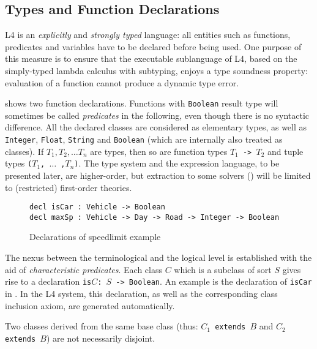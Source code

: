 \subsection{Types and Function Declarations}\label{sec:fundecls}

L4 is an \emph{explicitly} and \emph{strongly typed} language: all entities
such as functions, predicates and variables have to be declared before being
used. One purpose of this measure is to ensure that the executable sublanguage
of L4, based on the simply-typed lambda calculus with subtyping, enjoys a type
soundness property: evaluation of a function cannot produce a dynamic type
error.

 shows two function declarations. Functions with
\texttt{Boolean} result type will sometimes be called \emph{predicates} in the
following, even though there is no syntactic difference. All the declared
classes are considered as elementary types, as well as \texttt{Integer},
\texttt{Float}, \texttt{String} and \texttt{Boolean} (which are internally also treated as
classes). If $T_1, T_2, \dots T_n$ are types, then so are function types
\texttt{$T_1$ -> $T_2$} and tuple types \texttt{($T_1$, $\dots$ ,$T_n$)}. The
type system and the expression language, to be presented later, are
higher-order, but extraction to some solvers (\secref{}) will be limited to
(restricted) first-order theories.

\begin{figure}[h]
\begin{lstlisting}
decl isCar : Vehicle -> Boolean
decl maxSp : Vehicle -> Day -> Road -> Integer -> Boolean
\end{lstlisting}
  \caption{Declarations of speedlimit example}\label{fig:fundecls}
\end{figure}

The nexus between the terminological and the logical level is established with
the aid of \emph{characteristic predicates}. Each class $C$ which is a
subclass of sort $S$ gives rise to a declaration \texttt{is$C$: $S$ ->
  Boolean}. An example is the declaration of \texttt{isCar} in
. In the L4 system, this declaration, as well as the
corresponding class inclusion axiom, are generated
automatically.

Two classes derived from the same base class (thus: \texttt{$C_1$ extends $B$}
and \texttt{$C_2$ extends $B$}) are not necessarily disjoint. 

